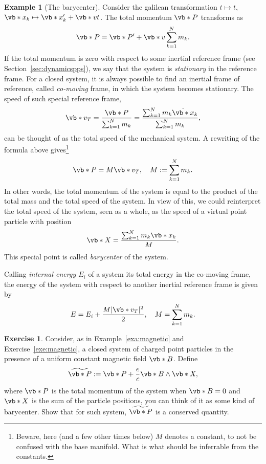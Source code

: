 \documentclass[english,fontsize=11pt,paper=b5]{scrbook}
\theoremstyle{definition}
\newtheorem{example}{Example}[chapter]
\newtheorem{exercise}{Exercise}[chapter]
\begin{document}
    \begin{example}[The barycenter]
      Consider the galilean transformation $t \mapsto t$, $\vb*{x}_k \mapsto \vb*{x}'_k + \vb*{v}t$.
      The total momentum $\vb*{P}$ transforms as
      \begin{equation}
        \vb*{P} = \vb*{P}' + \vb*{v}  \sum_{k=1}^N m_k.
      \end{equation}
      If the total momentum is zero with respect to some inertial reference frame (see Section~\ref{sec:dynamicspps}), we say that the system is \emph{stationary} in the reference frame. For a closed system, it is always possible to find an inertial frame of reference, called \emph{co-moving} frame, in which the system becomes stationary. The speed of such special reference frame,
      \begin{equation}
        \vb*{v_T} = \frac{\vb*{P}}{\sum_{k=1}^N m_k}
        = \frac{\sum_{k=1}^N m_k \dot{\vb*{x}}_k}{\sum_{k=1}^N m_k},
      \end{equation}
      can be thought of as the total speed of the mechanical system.
      A rewriting of the formula above gives\footnote{Beware, here (and a few other times below) $M$ denotes a constant, to not be confused with the base manifold. What is what should be inferrable from the constants.}
      \begin{equation}
        \vb*{P} = M \vb*{v_T}, \quad M:= \sum_{k=1}^N m_k.
      \end{equation}
      In other words, the total momentum of the system is equal to the product of the total mass and the total speed of the system.
      In view of this, we could reinterpret the total speed of the system, seen as a whole, as the speed of a virtual point particle with position
      \begin{equation}
        \vb*{X} = \frac{\sum_{k=1}^N m_k \vb*{x}_k}{M}.
      \end{equation}
      This special point is called \emph{barycenter} of the system.
      \medskip

      Calling \emph{internal energy $E_i$} of a system its total energy in the co-moving frame, the energy of the system with respect to another inertial reference frame is given by
      \begin{equation}
        E = E_i + \frac{M |\vb*{v_T}|^2}{2}, \quad M= \sum_{k=1}^N m_k.
      \end{equation}
    \end{example}

    \begin{exercise}
      Consider, as in Example~\ref{exa:magnetic} and Exercise~\ref{exe:magnetic}, a closed system of charged point particles in the presence of a uniform constant magnetic field $\vb*{B}$. Define
      \begin{equation}
        \widetilde{\vb*{P}} := \vb*{P} + \frac{e}c \vb*{B}\wedge \vb*{X},
      \end{equation}
      where $\vb*{P}$ is the total momentum of the system when $\vb*{B} = 0$ and $\vb*{X}$ is the sum of the particle positions, you can think of it as some kind of barycenter.
      Show that for such system, $\widetilde{\vb*{P}}$ is a conserved quantity.
    \end{exercise}
\end{document}
